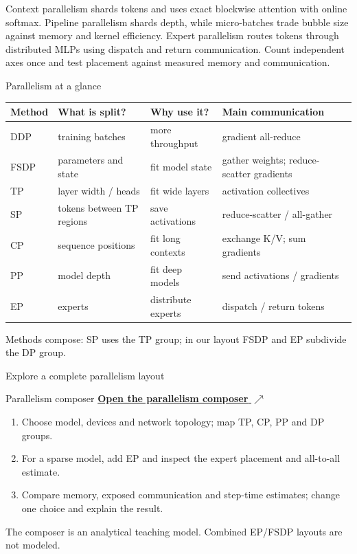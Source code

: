 \documentclass[handout]{beamer}
\begin{document}
\takeaways
{Context parallelism shards tokens and uses exact blockwise attention with online softmax.}
{Pipeline parallelism shards depth, while micro-batches trade bubble size against memory and kernel efficiency.}
{Expert parallelism routes tokens through distributed MLPs using dispatch and return communication.}
{Count independent axes once and test placement against measured memory and communication.}
\begin{frame}{Parallelism at a glance}
  \footnotesize
  \setlength{\tabcolsep}{3pt}
  \begin{tabular}{@{}>{\raggedright\arraybackslash}p{.10\linewidth}>{\raggedright\arraybackslash}p{.25\linewidth}>{\raggedright\arraybackslash}p{.22\linewidth}>{\raggedright\arraybackslash}p{.29\linewidth}@{}}
    \toprule
    Method & What is split? & Why use it? & Main communication \\
    \midrule
    DDP & training batches & more throughput & gradient all-reduce \\[1pt]
    FSDP & parameters and state & fit model state & gather weights; reduce-scatter gradients \\[1pt]
    TP & layer width / heads & fit wide layers & activation collectives \\[1pt]
    SP & tokens between TP regions & save activations & reduce-scatter / all-gather \\[1pt]
    CP & sequence positions & fit long contexts & exchange K/V; sum gradients \\[1pt]
    PP & model depth & fit deep models & send activations / gradients \\[1pt]
    EP & experts & distribute experts & dispatch / return tokens \\[1pt]
    \bottomrule
  \end{tabular}
  \vfill
  \scriptsize Methods compose: SP uses the TP group; in our layout FSDP and EP subdivide the DP group.
\end{frame}

\begin{frame}{Explore a complete parallelism layout}
  \begin{block}{Parallelism composer}
    \href{https://brain-bzh.github.io/llm-course/demos/parallelism-composer.html}{\textbf{Open the parallelism composer} $\nearrow$}
  \end{block}
  \begin{enumerate}
    \item Choose model, devices and network topology; map TP, CP, PP and DP groups.
    \item For a sparse model, add EP and inspect the expert placement and all-to-all estimate.
    \item Compare memory, exposed communication and step-time estimates; change one choice and explain the result.
  \end{enumerate}
  \small The composer is an analytical teaching model. Combined EP/FSDP layouts are not modeled.
\end{frame}
\end{document}
